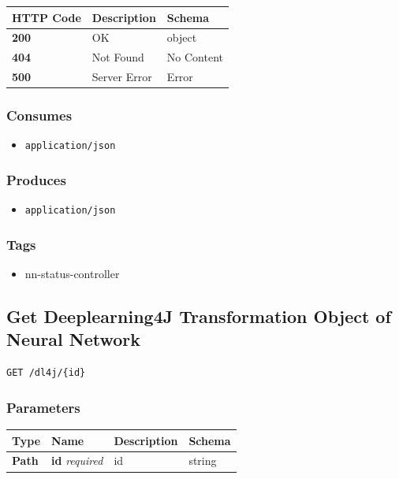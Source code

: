 \begin{longtable}[]{@{}lll@{}}
\toprule
HTTP Code & Description & Schema\tabularnewline
\midrule
\endhead
\textbf{200} & OK & object\tabularnewline
\textbf{404} & Not Found & No Content\tabularnewline
\textbf{500} & Server Error & Error\tabularnewline
\bottomrule
\end{longtable}

\subsubsection{Consumes}\label{consumes-6}

\begin{itemize}
\tightlist
\item
  \texttt{application/json}
\end{itemize}

\subsubsection{Produces}\label{produces-12}

\begin{itemize}
\tightlist
\item
  \texttt{application/json}
\end{itemize}

\subsubsection{Tags}\label{tags-12}

\begin{itemize}
\tightlist
\item
  nn-status-controller
\end{itemize}

\subsection{Get Deeplearning4J Transformation Object of Neural
Network}\label{get-deeplearning4j-transformation-object-of-neural-network}

\begin{verbatim}
GET /dl4j/{id}
\end{verbatim}

\subsubsection{Parameters}\label{parameters-11}

\begin{longtable}[]{@{}llll@{}}
\toprule
Type & Name & Description & Schema\tabularnewline
\midrule
\endhead
\textbf{Path} & \textbf{id} \emph{required} & id & string\tabularnewline
\bottomrule
\end{longtable}

